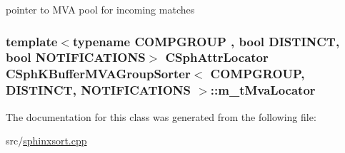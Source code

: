 pointer to M\-V\-A pool for incoming matches 

\hypertarget{classCSphKBufferMVAGroupSorter_a50f87adb9205082d6a8539019e5f520a}{
\subsubsection[{m\-\_\-t\-Mva\-Locator}]{\setlength{\rightskip}{0pt plus 5cm}template$<$typename C\-O\-M\-P\-G\-R\-O\-U\-P , bool D\-I\-S\-T\-I\-N\-C\-T, bool N\-O\-T\-I\-F\-I\-C\-A\-T\-I\-O\-N\-S$>$ {\bf C\-Sph\-Attr\-Locator} {\bf C\-Sph\-K\-Buffer\-M\-V\-A\-Group\-Sorter}$<$ C\-O\-M\-P\-G\-R\-O\-U\-P, D\-I\-S\-T\-I\-N\-C\-T, N\-O\-T\-I\-F\-I\-C\-A\-T\-I\-O\-N\-S $>$\-::m\-\_\-t\-Mva\-Locator\hspace{0.3cm}{\ttfamily [protected]}}}\label{classCSphKBufferMVAGroupSorter_a50f87adb9205082d6a8539019e5f520a}


The documentation for this class was generated from the following file\-:\begin{DoxyCompactItemize}
\item 
src/\hyperlink{sphinxsort_8cpp}{sphinxsort.\-cpp}\end{DoxyCompactItemize}
